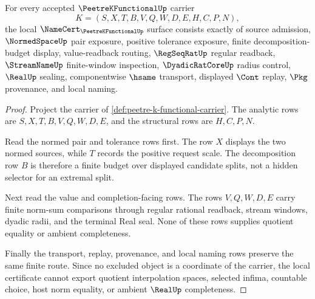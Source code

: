 \begin{theorem}
\label{thm:peetre-k-functional-namecert-obligations}
For every accepted $\PeetreKFunctionalUp$ carrier
$$
K=(S,X,T,B,V,Q,W,D,E,H,C,P,N),
$$
the local $\NameCert_{\PeetreKFunctionalUp}$ surface consists exactly of source admission, $\NormedSpaceUp$ pair exposure, positive tolerance exposure, finite decomposition-budget display, value-readback routing, $\RegSeqRatUp$ regular readback, $\StreamNameUp$ finite-window inspection, $\DyadicRatCoreUp$ radius control, $\RealUp$ sealing, componentwise $\hsame$ transport, displayed $\Cont$ replay, $\Pkg$ provenance, and local naming.
\end{theorem}
\begin{proof}
Project the carrier of \autoref{def:peetre-k-functional-carrier}. The analytic rows are $S,X,T,B,V,Q,W,D,E$, and the structural rows are $H,C,P,N$.

Read the normed pair and tolerance rows first. The row $X$ displays the two normed sources, while $T$ records the positive request scale. The decomposition row $B$ is therefore a finite budget over displayed candidate splits, not a hidden selector for an extremal split.

Next read the value and completion-facing rows. The rows $V,Q,W,D,E$ carry finite norm-sum comparisons through regular rational readback, stream windows, dyadic radii, and the terminal Real seal. None of these rows supplies quotient equality or ambient completeness.

Finally the transport, replay, provenance, and local naming rows preserve the same finite route. Since no excluded object is a coordinate of the carrier, the local certificate cannot export quotient interpolation spaces, selected infima, countable choice, host norm equality, or ambient $\RealUp$ completeness.
\end{proof}

